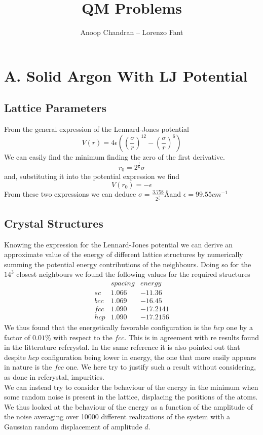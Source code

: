 \documentclass[a4paper]{article}
\title{QM Problems}
\author{Anoop Chandran -- Lorenzo Fant}
\begin{document}
\maketitle


\section{A. Solid Argon With LJ Potential}

\subsection{Lattice Parameters}
From the general expression of the Lennard-Jones potential
\begin{equation}
V(r) = 4\epsilon\left(\left(\frac{\sigma}{r}\right)^12-\left(\frac{\sigma}{r}\right)^6\right)
\end{equation}
We can easily find the minimum finding the zero of the first derivative.
\begin{equation}
r_0 = 2^{\frac{1}{6}}\sigma
\end{equation}
and, substituting it into the potential expression we find
\begin{equation}
V(r_0) = -\epsilon
\end{equation}
From these two expressions we can deduce $\sigma = \frac{3.758}{2^{\frac{1}{6}}}$\AA and $\epsilon = 99.55 cm^{-1}$
\subsection{Crystal Structures}
Knowing the expression for the Lennard-Jones potential we can derive an approximate value of the energy of different lattice structures by numerically summing the potential energy contributions of the neighbours.
Doing so for the $14^3$ closest neighbours we found the following values for the required structures
\begin{eqnarray*}
&spacing&energy\\
sc&1.066&-11.36\\
bcc&1.069&-16.45\\
fcc&1.090&-17.2141\\
hcp&1.090&-17.2156
\end{eqnarray*}
We thus found that the energetically favorable configuration is the $hcp$ one by a factor of $0.01\%$ with respect to the $fcc$.
This is in agreement with re results found in the litterature ref{crystal}. 
In the same reference it is also pointed out that despite $hcp$ configuration being lower in energy, the one that more easily appears in nature is the $fcc$ one.
We here try to justify such a result without considering, as done in ref{crystal}, impurities.\\
We can instead try to consider the behaviour of the energy in the minimum when some random noise is present in the lattice, displacing the positions of the atoms.
We thus looked at the behaviour of the energy as a function of the amplitude of the noise averaging over 10000 different realizations of the system with a Gaussian random displacement of amplitude $d$.
\end{document}
